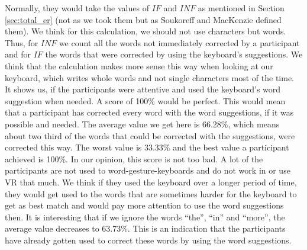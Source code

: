 Normally, they would take the values of $IF$ and $INF$ as mentioned in Section \ref{sec:total_er} (not as we took them but as Soukoreff and MacKenzie \cite{10.1145/642611.642632} defined them). We think for this calculation, we should not use characters but words. Thus, for $INF$ we count all the words not immediately corrected by a participant and for $IF$ the words that were corrected by using the keyboard's suggestions. We think that the calculation makes more sense this way when looking at our keyboard, which writes whole words and not single characters most of the time. It shows us, if the participants were attentive and used the keyboard's word suggestion when needed. A score of 100\% would be perfect. This would mean that a participant has corrected every word with the word suggestions, if it was possible and needed. The average value we get here is 66.28\%, which means about two third of the words that could be corrected with the suggestions, were corrected this way. The worst value is 33.33\% and the best value a participant achieved is 100\%. In our opinion, this score is not too bad. A lot of the participants are not used to word-gesture-keyboards and do not work in or use VR that much. We think if they used the keyboard over a longer period of time, they would get used to the words that are sometimes harder for the keyboard to get as best match and would pay more attention to use the word suggestions then. It is interesting that if we ignore the words ``the'', ``in'' and ``more'', the average value decreases to 63.73\%. This is an indication that the participants have already gotten used to correct these words by using the word suggestions.

